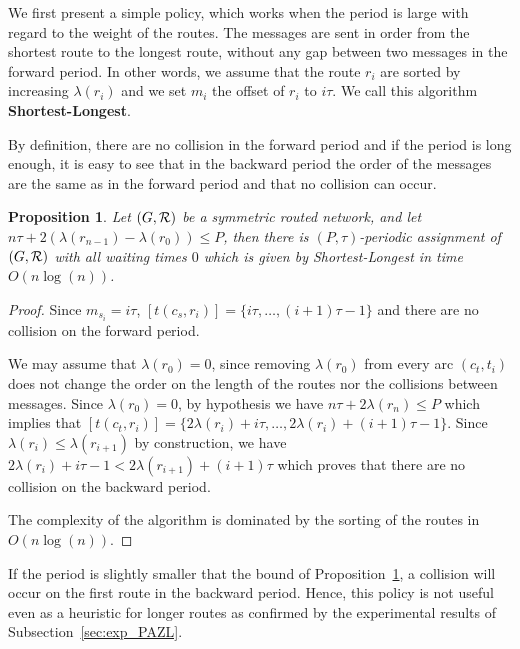 \documentclass[10pt, conference, letterpaper]{IEEEtran}
\newtheorem{proposition}{Proposition}
\begin{document}
    We first present a simple policy, which works when the period is large with regard to the weight of the routes.
    The messages are sent in order from the shortest route to the longest route, without any gap between two messages in the forward period.
    In other words, we assume that the route $r_i$ are sorted by increasing $\lambda(r_i)$ and we set $m_{i}$ the offset of $r_i$ to $i\tau$. We call this algorithm {\bf Shortest-Longest}.
      
     By definition, there are no collision in the forward period and if the period is long enough, 
     it is easy to see that in the backward period the order of the messages are the same as in the forward period and that no collision can occur. 
      
      
      \begin{proposition} Let $(G, {\cal R})$ be a symmetric routed network, and let $n\tau + 2(\lambda(r_{n-1}) - \lambda(r_{0})) \leq P$, then there is $(P,\tau)$-periodic assignment of $(G, {\cal R})$ with all waiting times $0$ which is given by Shortest-Longest in time $O(n\log(n))$.\label{prop:SL}
      \end{proposition}
      \begin{proof}
       Since $m_{s_i} = i\tau$, $[t(c_s,r_{i})] = \{i\tau,\dots, (i+1)\tau -1\}$ and there are no collision on the forward period.
       
       
       We may assume that $\lambda(r_{0}) = 0$, since removing $\lambda(r_{0})$ from every arc $(c_t,t_i)$ does not change the order on the length of the routes nor the collisions between messages.
       Since $\lambda(r_{0}) = 0$, by hypothesis we have $n\tau + 2\lambda(r_{n}) \leq P$ which implies that
       $[t(c_t,r_{i})] = \{2 \lambda(r_{i}) + i\tau, \dots,  2 \lambda(r_{i}) + (i+1)\tau -1\}$.
       Since $ \lambda(r_{i}) \leq  \lambda(r_{i+1})$ by construction, we have  $2 \lambda(r_{i}) + i\tau -1 < 2 \lambda(r_{i+1}) + (i+1)\tau$ which proves that there are no collision on the backward period. 
       
       The complexity of the algorithm is dominated by the sorting of the routes in $O(n\log(n))$. 
      \end{proof}

      If the period is slightly smaller that the bound of Proposition~\ref{prop:SL}, a collision will occur on the first route in the backward period. Hence, this policy is not useful even as a heuristic for longer routes as confirmed by the experimental results of Subsection~\ref{sec:exp_PAZL}. 
\end{document}
